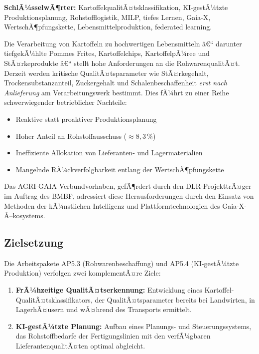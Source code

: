 ﻿\documentclass[12pt,a4paper]{article}
\theoremstyle{plain}
\theoremstyle{definition}
\begin{document}
	\textbf{SchlÃ¼sselwÃ¶rter:} KartoffelqualitÃ¤tsklassifikation, KI-gestÃ¼tzte
	Produktionsplanung, Rohstofflogistik, MILP, tiefes Lernen, Gaia-X,
	WertschÃ¶pfungskette, Lebensmittelproduktion, federated learning.
	
	Die Verarbeitung von Kartoffeln zu hochwertigen Lebensmitteln â€“ darunter
	tiefgekÃ¼hlte Pommes Frites, Kartoffelchips, KartoffelpÃ¼ree und StÃ¤rkeprodukte
	â€“ stellt hohe Anforderungen an die RohwarenqualitÃ¤t. Derzeit werden kritische
	QualitÃ¤tsparameter wie StÃ¤rkegehalt, Trockensubstanzanteil, Zuckergehalt und
	Schalenbeschaffenheit \emph{erst nach Anlieferung} am Verarbeitungswerk
	bestimmt. Dies fÃ¼hrt zu einer Reihe schwerwiegender betrieblicher Nachteile:
	
	\begin{itemize}[leftmargin=1.5em]
		\item Reaktive statt proaktiver Produktionsplanung
		\item Hoher Anteil an Rohstoffausschuss ($\approx 8{,}3\,\%$)
		\item Ineffiziente Allokation von Lieferanten- und Lagermaterialien
		\item Mangelnde RÃ¼ckverfolgbarkeit entlang der WertschÃ¶pfungskette
	\end{itemize}
	
	Das AGRI-GAIA Verbundvorhaben, gefÃ¶rdert durch den DLR-ProjekttrÃ¤ger im
	Auftrag des BMBF, adressiert diese Herausforderungen durch den Einsatz
	von Methoden der kÃ¼nstlichen Intelligenz und Plattformtechnologien des
	Gaia-X-Ã–kosystems.
	
	\subsection{Zielsetzung}
	
	Die Arbeitspakete AP5.3 (Rohwarenbeschaffung) und AP5.4
	(KI-gestÃ¼tzte Produktion) verfolgen zwei komplementÃ¤re Ziele:
	
	\begin{enumerate}[label=\textbf{Z\arabic*.}]
		\item \textbf{FrÃ¼hzeitige QualitÃ¤tserkennung:} Entwicklung eines
		Kartoffel-QualitÃ¤tsklassifika\-tors, der QualitÃ¤tsparameter bereits
		bei Landwirten, in LagerhÃ¤usern und wÃ¤hrend des Transports ermittelt.
		\item \textbf{KI-gestÃ¼tzte Planung:} Aufbau eines Planungs- und
		Steuerungssystems, das Rohstoffbedarfe der Fertigungslinien mit den
		verfÃ¼gbaren LieferantenqualitÃ¤ten optimal abgleicht.
	\end{enumerate}
	
\end{document}
